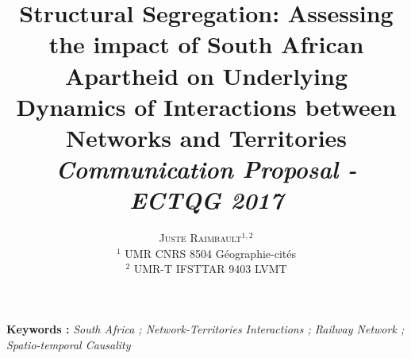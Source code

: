 \documentclass[11pt]{article}
\newcommand{\noun}[1]{\textsc{#1}}
\begin{document}
\title{\vspace{-2.5cm}Structural Segregation: Assessing the impact of South African Apartheid on Underlying Dynamics of Interactions between Networks and Territories
\\
\textit{Communication Proposal - ECTQG 2017}
}
\author{\noun{Juste Raimbault}$^{1,2}$%
\\
$^1$ UMR CNRS 8504 Géographie-cités\\
$^2$ UMR-T IFSTTAR 9403 LVMT%
}
\date{}

\maketitle

\justify



\textbf{Keywords : }\textit{South Africa ; Network-Territories Interactions ; Railway Network ; Spatio-temporal Causality}

\medskip
\end{document}
